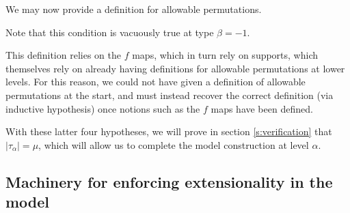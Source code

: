 \documentclass{article}
\newif\ifshowannotations
\newcommand{\annot}[1]{\ifshowannotations\marginpar{#1}\fi}
\theoremstyle{definition}
\theoremstyle{remark}
\newcommand{\ihref}[1]{(\textbf{I\ref{#1}})}
\begin{document}
{We may now provide a definition for allowable permutations.


\noindent Note that this condition is vacuously true at type $\beta = -1$.

This definition relies on the $f$ maps, which in turn rely on supports, which themselves rely on already having definitions for allowable permutations at lower levels.
For this reason, we could not have given a definition of allowable permutations at the start, and must instead recover the correct definition (via inductive hypothesis) once notions such as the $f$ maps have been defined.

With these latter four hypotheses, we will prove in section \ref{s:verification} that $|\tau_\alpha| = \mu$, which will allow us to complete the model construction at level $\alpha$.
\annot{\scriptsize Note that the only data-carrying hypotheses are \ihref{ih:tau}, \ihref{ih:allowable}, \ihref{ih:position}.}

\subsection{Machinery for enforcing extensionality in the model}\label{ss:extensionality_machinery}



}
\end{document}

